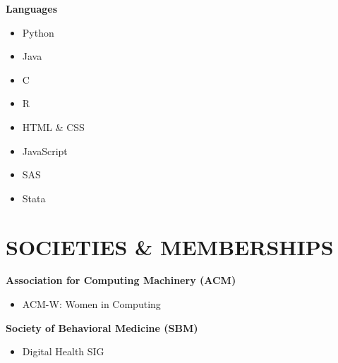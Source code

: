\documentclass[a4paper,12pt]{article}
\begin{document}
{\begin{center}
\textbf{Languages} \\
\end{center}
\begin{multicols}{4}
\begin{itemize}
  \item Python
  \item Java
  \item C
  \item R
  \item HTML \& CSS
  \item JavaScript
  \item SAS
  \item Stata
\end{itemize}
\end{multicols}

\section*{SOCIETIES \& MEMBERSHIPS}
\textbf{Association for Computing Machinery (ACM)}
\begin{itemize}
  \item ACM-W: Women in Computing
\end{itemize}
\textbf{Society of Behavioral Medicine (SBM)}
\begin{itemize}
  \item Digital Health SIG
\end{itemize}

}
\end{document}
